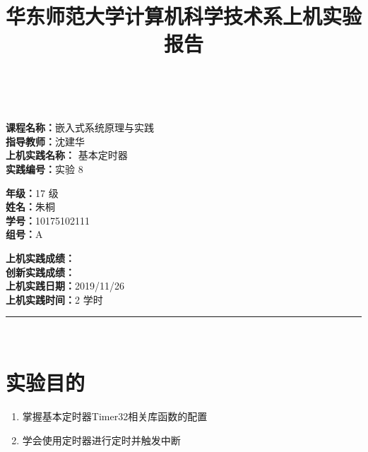 \documentclass[a4paper,10pt,UTF8]{paper}
\title{华东师范大学计算机科学技术系上机实验报告}
\numberwithin{equation}{section}
\numberwithin{figure}{section}
\begin{document}
\pagestyle{fancy}
\lhead{}
\rhead{}
\makeatletter
\def\headrule{{\if@fancyplain\let\headrulewidth\plainheadrulewidth\fi%
    \color{gray}\hrule\@height 0.2pt\@width\headwidth}
    \vspace{6mm}}
\makeatother

\newcommand{\HRule}{\rule{\linewidth}{1mm}}
\newcommand{\dai}{\textbf{Dais-CMX16$^+$}}

{ \\ [0.8cm]
    
    \small{
        \begin{minipage}[t]{.32\linewidth}
            \textbf{课程名称：}嵌入式系统原理与实践\\
            \textbf{指导教师：}沈建华\\
            \textbf{上机实践名称：} 基本定时器\\
            \textbf{实践编号：}实验 8
        \end{minipage}
        \begin{minipage}[t]{.32\linewidth}
            \textbf{年级：}17 级\\
            \textbf{姓名：}朱桐\\
            \textbf{学号：}10175102111\\
            \textbf{组号：}A
        \end{minipage} 
        \begin{minipage}[t]{.32\linewidth}
            \textbf{上机实践成绩：} \\
            \textbf{创新实践成绩：} \\
            \textbf{上机实践日期：}2019/11/26\\
            \textbf{上机实践时间：}2 学时\\
        \end{minipage}
    }
    \HRule \\[0.5cm]
}


\section{实验目的}

\begin{enumerate}
    \item 掌握基本定时器Timer32相关库函数的配置
    \item 学会使用定时器进行定时并触发中断
\end{enumerate}
\end{document}

